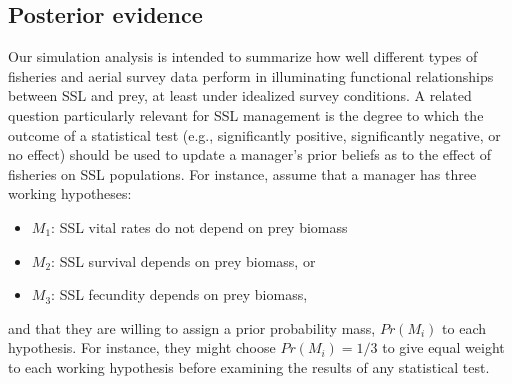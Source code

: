 \documentclass[nonumbib,leqno]{nrc1}
\begin{document}
\subsection{Posterior evidence}

Our simulation analysis is intended to summarize how well different types of fisheries and aerial survey data perform in illuminating functional relationships between SSL and prey, at least under idealized survey conditions.  A related question particularly relevant for SSL management is the degree to which the outcome of a statistical test (e.g., significantly positive, significantly negative, or no effect) should be used to update a manager's prior beliefs as to the effect of fisheries on SSL populations.  For instance, assume that a manager has three working hypotheses: 
\begin{itemize}
\item $M_1$: SSL vital rates do not depend on prey biomass
\item $M_2$: SSL survival depends on prey biomass, or
\item $M_3$: SSL fecundity depends on prey biomass,
\end{itemize}
and that they are willing to assign a prior probability mass, $Pr(M_i)$ to each hypothesis.  For instance, 
they might choose $Pr(M_i)=1/3$ to give equal weight to each working hypothesis before examining the results of any statistical test.
\end{document}
